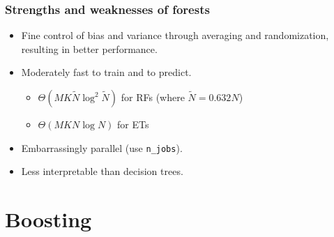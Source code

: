 \documentclass{beamer}
\begin{document}
\begin{frame}
  \frametitle{Strengths and weaknesses of forests}

  \begin{itemize}

    \item {\color{blue}Fine control} of bias and variance through averaging
          and randomization, resulting in {\color{blue} better performance}.

    \vspace{0.25cm}

    \item Moderately fast to train and to predict.
        \begin{itemize}
            \item $\Theta(MK\widetilde{N}\log^2 \widetilde{N})$ for RFs (where $\widetilde{N} = 0.632N$)
            \item $\Theta(MKN\log N)$ for ETs
        \end{itemize}

    \vspace{0.25cm}

    \item Embarrassingly {\color{blue} parallel} (use \texttt{n\_jobs}).

    \vspace{0.25cm}

    \item {\color{red} Less interpretable} than decision trees.
  \end{itemize}
\end{frame}



\section{Boosting}
\end{document}
